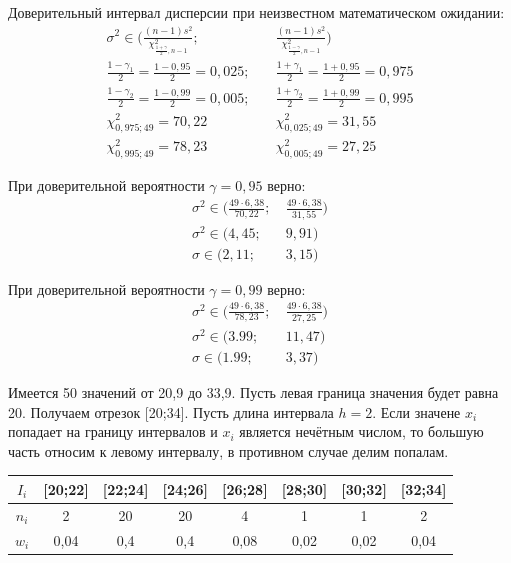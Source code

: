 \documentclass[utf8, a4paper, 14pt, russian, oneside]{book}
\begin{document}
Доверительный интервал дисперсии при неизвестном математическом ожидании:
\begin{align*}
    \sigma^2 \in \Bigg( \frac{(n-1)s^2}{\chi^2_{\tfrac{1+\gamma}{2},n-1}};\ & \frac{(n-1)s^2}{\chi^2_{\tfrac{1-\gamma}{2},n-1}} \Bigg)\\
    \frac{1-\gamma_1}{2} = \frac{1 - 0,95}{2} = 0,025; \quad& \frac{1+\gamma_1}{2} = \frac{1+0,95}{2} = 0,975\\
    \frac{1-\gamma_2}{2} = \frac{1 - 0,99}{2} = 0,005; \quad& \frac{1+\gamma_2}{2} = \frac{1+0,99}{2} = 0,995\\
    \chi^2_{0,975;49} = 70,22 \qquad& \chi^2_{0,025;49} = 31,55 \\
    \chi^2_{0,995;49} = 78,23 \qquad& \chi^2_{0,005;49} = 27,25
\end{align*}

При доверительной вероятности $\gamma=0,95$ верно:
\begin{align*}
    \sigma^2 \in \Big( \frac{49 \cdot 6,38}{70,22};\  & \frac{49 \cdot 6,38}{31,55} \Big)\\
    \sigma^2 \in (4,45;\  & 9,91)\\
    \sigma \in (2,11;\  & 3,15)
\end{align*}

При доверительной вероятности $\gamma=0,99$ верно:
\begin{align*}
    \sigma^2 \in \Big( \frac{49 \cdot 6,38}{78,23};\  & \frac{49 \cdot 6,38}{27,25} \Big)\\
    \sigma^2 \in (3.99;\  & 11,47)\\
    \sigma \in (1.99;\  & 3,37)
\end{align*}

\newpage

Имеется 50 значений от 20,9 до 33,9. Пусть левая граница значения будет равна 20. Получаем отрезок [20;34].
Пусть длина интервала $h=2$.
Если значене $x_i$ попадает на границу интервалов и $x_i$ является нечётным числом, то большую часть относим к левому интервалу, в противном
случае делим попалам.
\begin{table}[h!]
    \centering
    \begin{tabular}{|c|c|c|c|c|c|c|c|}
        \hline
        $I_i$ & [20;22] & [22;24] & [24;26] & [26;28] & [28;30] & [30;32] & [32;34]\\
        \hline
        $n_i$ & 2 & 20 & 20 & 4 & 1 & 1 & 2 \\
        \hline
        $w_i$ & 0,04 & 0,4 & 0,4 & 0,08 & 0,02 & 0,02 & 0,04 \\
        \hline
    \end{tabular}
\end{table}
\end{document}

